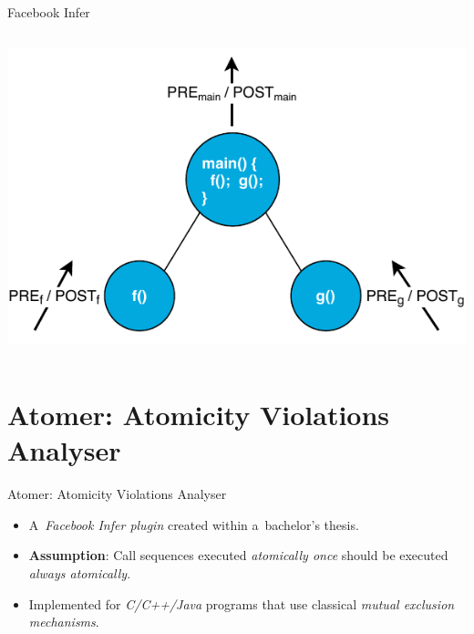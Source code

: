 \documentclass[%
    10pt, xcolor=pdflatex, hyperref={unicode}, aspectratio=169%
]{beamer}
\begin{document}
\begin{frame}{Facebook Infer}
\begin{columns}
        \begin{column}{.45 \linewidth}
            \begin{center}
                \includegraphics[width=1 \linewidth]{img/infer.pdf}
            \end{center}
        \end{column}
    \end{columns}
\end{frame}


\section{Atomer: Atomicity Violations Analyser}
\begin{frame}{Atomer: Atomicity Violations Analyser}
    \begin{itemize}\setlength\itemsep{3em}
        \item
            A~\emph{Facebook Infer plugin} created within
            a~bachelor's thesis.

        \item
            \textbf{Assumption}: \alert{Call sequences} executed
            \emph{atomically once} should be executed
            \emph{always atomically}.

        \item
            Implemented for \emph{C/C++/Java} programs
            that use classical \emph{mutual exclusion mechanisms}.
    \end{itemize}
\end{frame}


\end{document}

